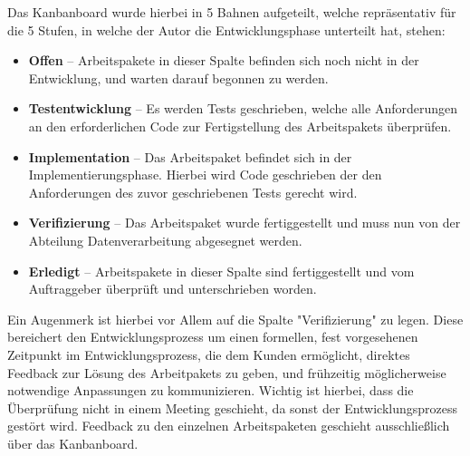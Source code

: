 Das Kanbanboard wurde hierbei in 5 Bahnen aufgeteilt, welche repräsentativ für
die 5 Stufen, in welche der Autor die Entwicklungsphase unterteilt hat, stehen:
\begin{itemize}
    \item \textbf{Offen} -- Arbeitspakete in dieser Spalte befinden sich noch
    nicht in der Entwicklung, und warten darauf begonnen zu werden.
    \item \textbf{Testentwicklung} -- Es werden Tests geschrieben, welche alle
    Anforderungen an den erforderlichen Code zur Fertigstellung des Arbeitspakets
    überprüfen.
    \item \textbf{Implementation} -- Das Arbeitspaket befindet sich in der
    Implementierungsphase. Hierbei wird Code geschrieben der den Anforderungen
    des zuvor geschriebenen Tests gerecht wird.
    \item \textbf{Verifizierung} -- Das Arbeitspaket wurde fertiggestellt und
    muss nun von der Abteilung Datenverarbeitung abgesegnet werden.
    \item \textbf{Erledigt} -- Arbeitspakete in dieser Spalte sind fertiggestellt
    und vom Auftraggeber überprüft und unterschrieben worden.
\end{itemize}

Ein Augenmerk ist hierbei vor Allem auf die Spalte "Verifizierung" zu legen.
Diese bereichert den Entwicklungsprozess um einen formellen, fest vorgesehenen
Zeitpunkt im Entwicklungsprozess, die dem Kunden ermöglicht, direktes Feedback
zur Lösung des Arbeitpakets zu geben, und frühzeitig möglicherweise notwendige
Anpassungen zu kommunizieren. Wichtig ist hierbei, dass die Überprüfung nicht in
einem Meeting geschieht, da sonst der Entwicklungsprozess gestört wird. Feedback
zu den einzelnen Arbeitspaketen geschieht ausschließlich über das Kanbanboard.\par

